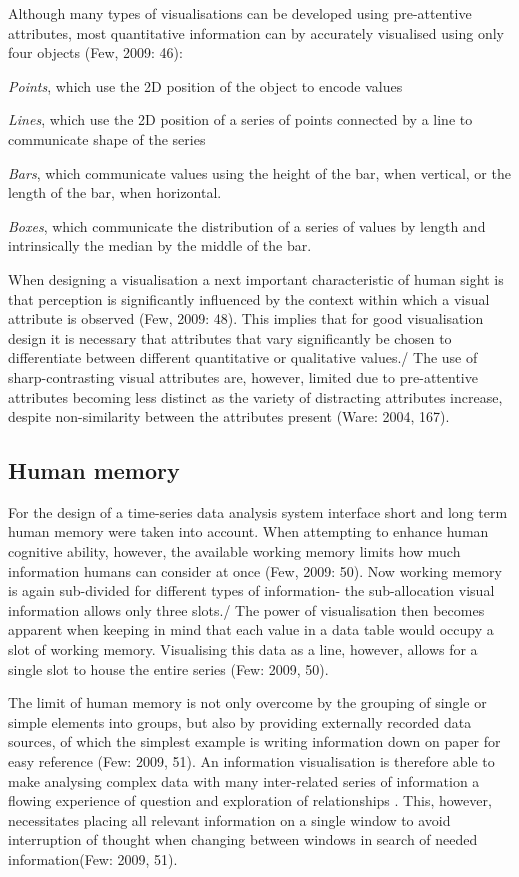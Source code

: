 \documentclass[a4paper,12pt]{article}
\begin{document}
     Although many types of visualisations can be developed using pre-attentive attributes, most quantitative information can by accurately visualised using only four objects (Few, 2009: 46):
     	\item{\emph{Points}, which use the 2D position of the object to encode values
	\item{\emph{Lines}, which use the 2D position of a series of points connected by a line to communicate shape of the series
	\item{\emph{Bars}, which communicate values using the height of the bar, when vertical, or the length of the bar, when horizontal.
	\item{\emph{Boxes}, which communicate the distribution of a series of values by length and intrinsically the median by the middle of the bar.
	
 When designing a visualisation a next important characteristic of human sight is that perception is significantly influenced by the context within which a visual attribute is observed (Few, 2009: 48). This implies
 that for good visualisation design it is necessary that attributes that vary significantly be chosen to differentiate between different quantitative or qualitative values./
 The use of sharp-contrasting visual attributes are, however, limited due to pre-attentive attributes becoming less distinct as the variety of distracting attributes increase, despite non-similarity between the
 attributes present (Ware: 2004, 167).
 
\subsection{Human memory}
For the design of a time-series data analysis system interface short and long term human memory were taken into account. When attempting to enhance human cognitive ability, however, 
the available working memory limits how much information humans can consider at once (Few, 2009: 50). Now working memory is again sub-divided for different types of information- the sub-allocation
visual information allows only three slots./
The power of visualisation then becomes apparent when keeping in mind that each value in a data table would occupy a slot of working memory. Visualising this data as a line, however, allows for a single
slot to house the entire series (Few: 2009, 50).

The limit of human memory is not only overcome by the grouping of single or simple elements into groups, but also by providing externally recorded data sources, of which the simplest example 
is writing information down on paper for easy reference (Few: 2009, 51).
An information visualisation is therefore able to make analysing complex data with many inter-related series of information a flowing experience of question and exploration of relationships .
This, however, necessitates placing all relevant information on a single window to avoid interruption of thought when changing between windows in search of needed information(Few: 2009, 51).

}}}}
\end{document}
